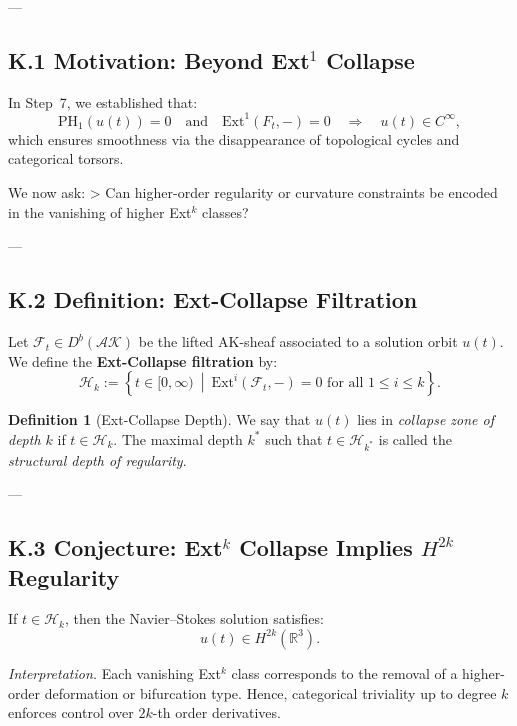 \documentclass[11pt]{article}
\theoremstyle{definition}
\newtheorem{definition}[theorem]{Definition}
\begin{document}
---

\subsection*{K.1 Motivation: Beyond Ext$^1$ Collapse}

In Step~7, we established that:
\[
\mathrm{PH}_1(u(t)) = 0 \quad \text{and} \quad \mathrm{Ext}^1(F_t, -) = 0 \quad \Rightarrow \quad u(t) \in C^\infty,
\]
which ensures smoothness via the disappearance of topological cycles and categorical torsors.

We now ask:
> Can higher-order regularity or curvature constraints be encoded in the vanishing of higher Ext$^k$ classes?

---

\subsection*{K.2 Definition: Ext-Collapse Filtration}

Let \( \mathcal{F}_t \in D^b(\mathcal{AK}) \) be the lifted AK-sheaf associated to a solution orbit \( u(t) \).  
We define the \textbf{Ext-Collapse filtration} by:
\[
\mathcal{H}_k := \left\{ t \in [0, \infty) \ \middle| \ \mathrm{Ext}^i(\mathcal{F}_t, -) = 0 \text{ for all } 1 \leq i \leq k \right\}.
\]

\begin{definition}[Ext-Collapse Depth]
We say that \( u(t) \) lies in \emph{collapse zone of depth \( k \)} if \( t \in \mathcal{H}_k \).  
The maximal depth \( k^\ast \) such that \( t \in \mathcal{H}_{k^\ast} \) is called the \emph{structural depth of regularity}.
\end{definition}

---

\subsection*{K.3 Conjecture: Ext$^k$ Collapse Implies $H^{2k}$ Regularity}

\begin{conjecture}
If \( t \in \mathcal{H}_k \), then the Navier--Stokes solution satisfies:
\[
u(t) \in H^{2k}(\mathbb{R}^3).
\]
\end{conjecture}

\textit{Interpretation.}  
Each vanishing Ext$^k$ class corresponds to the removal of a higher-order deformation or bifurcation type.  
Hence, categorical triviality up to degree \( k \) enforces control over \( 2k \)-th order derivatives.
\end{document}
